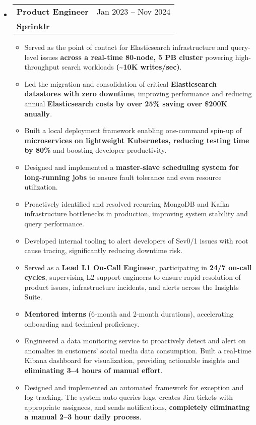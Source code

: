 \documentclass[letterpaper,10.8pt]{article}
\makeatletter
\newcommand{\resumeSubheading}[4]{
  \vspace{-1pt}\item
    \begin{tabular*}{0.97\textwidth}{l@{\extracolsep{\fill}}r}
      \textbf{#1} & #2 \\
      \textbf{#3} & \textit{\small #4} \\
    \end{tabular*}\vspace{-5pt}
}
\newcommand{\resumeSubHeadingListStart}{\begin{itemize}[leftmargin=*]}
\newcommand{\resumeSubHeadingListEnd}{\end{itemize}}
\makeatother
\begin{document}
\resumeSubHeadingListStart
  \resumeSubheading
    {Product Engineer}{Jan 2023 – Nov 2024}
    {Sprinklr}{}
    \begin{itemize}[itemsep=0pt]
        \item Served as the point of contact for Elasticsearch infrastructure and query-level issues \textbf{across a real-time 80-node, 5 PB cluster} powering high-throughput search workloads \textbf{(\textasciitilde10K writes/sec)}.
        \item Led the migration and consolidation of critical \textbf{Elasticsearch datastores with zero downtime}, improving performance and reducing annual \textbf{Elasticsearch costs by over 25\% saving over \$200K anually}.
        \item Built a local deployment framework enabling one-command spin-up of \textbf{microservices on lightweight Kubernetes, reducing testing time by 80\%} and boosting developer productivity.
        \item Designed and implemented a \textbf{master-slave scheduling system for long-running jobs} to ensure fault tolerance and even resource utilization.
        \item Proactively identified and resolved recurring MongoDB and Kafka infrastructure bottlenecks in production, improving system stability and query performance.
        \item Developed internal tooling to alert developers of Sev0/1 issues with root cause tracing, significantly reducing downtime risk.
        \item Served as a \textbf{Lead L1 On-Call Engineer}, participating in \textbf{24/7 on-call cycles}, supervising L2 support engineers to ensure rapid resolution of product issues, infrastructure incidents, and alerts across the Insights Suite.
        \item \textbf{Mentored interns} (6-month and 2-month durations), accelerating onboarding and technical proficiency.
        \item Engineered a data monitoring service to proactively detect and alert on anomalies in customers' social media data consumption. Built a real-time Kibana dashboard for visualization, providing actionable insights and \textbf{eliminating 3–4 hours of manual effort}.
        \item Designed and implemented an automated framework for exception and log tracking. The system auto-queries logs, creates Jira tickets with appropriate assignees, and sends notifications, \textbf{completely eliminating a manual 2–3 hour daily process}.
    \end{itemize}
\resumeSubHeadingListEnd
\end{document}
